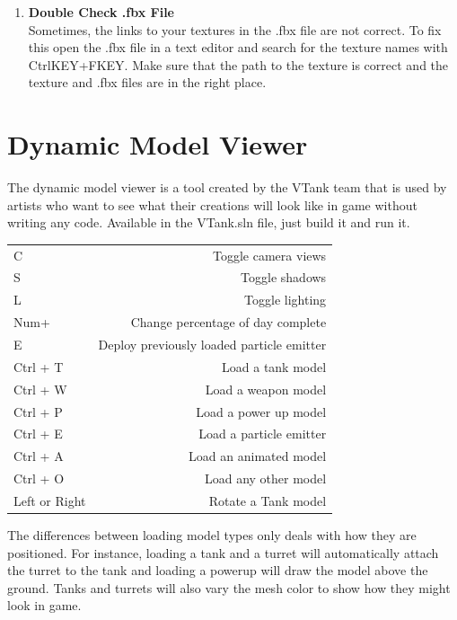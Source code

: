 \begin {enumerate}
\item {\bf Double Check .fbx File}\\
Sometimes, the links to your textures in the .fbx file are not correct. To fix this open the .fbx file in a text editor and search for the texture names with CtrlKEY+FKEY. Make sure that the path to the texture is correct and the texture and .fbx files are in the right place. 

\end{enumerate}

\section{Dynamic Model Viewer}

The dynamic model viewer is a tool created by the VTank team that is used by artists who want to see what their creations will look like in game without writing any code. Available in the VTank.sln file, just build it and run it. 


\begin{table}[h]
	\centering
		\begin{tabular} {l | r}
		C & Toggle camera views \\
		S & Toggle shadows \\
		L & Toggle lighting \\
		Num+ & Change percentage of day complete \\
		E & Deploy previously loaded particle emitter \\
		Ctrl + T & Load a tank model \\
		Ctrl + W & Load a weapon model \\
		Ctrl + P & Load a power up model \\
		Ctrl + E & Load a particle emitter \\
		Ctrl + A & Load an animated model \\
		Ctrl + O & Load any other model \\
		Left or Right & Rotate a Tank model \\
			
		\end{tabular}
\end{table}

The differences between loading model types only deals with how they are positioned. For instance, loading a tank and a turret will automatically attach the turret to the tank and loading a powerup will draw the model above the ground. Tanks and turrets will also vary the mesh color to show how they might look in game. 

